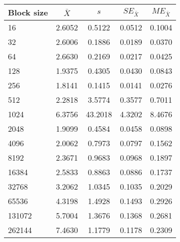 \begin{tabular}{lcccc}\toprule
{\small Block size} & $\bar{X}$ & $s$ & $SE_{\bar{X}}$ & $ME_{\bar{X}}$ \\\midrule
16 & 2.6052 & 0.5122 & 0.0512 & 0.1004\\
32 & 2.6006 & 0.1886 & 0.0189 & 0.0370\\
64 & 2.6630 & 0.2169 & 0.0217 & 0.0425\\
128 & 1.9375 & 0.4305 & 0.0430 & 0.0843\\
256 & 1.8141 & 0.1415 & 0.0141 & 0.0276\\
512 & 2.2818 & 3.5774 & 0.3577 & 0.7011\\
1024 & 6.3756 & 43.2018 & 4.3202 & 8.4676\\
2048 & 1.9099 & 0.4584 & 0.0458 & 0.0898\\
4096 & 2.0062 & 0.7973 & 0.0797 & 0.1562\\
8192 & 2.3671 & 0.9683 & 0.0968 & 0.1897\\
16384 & 2.5833 & 0.8863 & 0.0886 & 0.1737\\
32768 & 3.2062 & 1.0345 & 0.1035 & 0.2029\\
65536 & 4.3198 & 1.4928 & 0.1493 & 0.2926\\
131072 & 5.7004 & 1.3676 & 0.1368 & 0.2681\\
262144 & 7.4630 & 1.1779 & 0.1178 & 0.2309\\
\bottomrule
\end{tabular}
